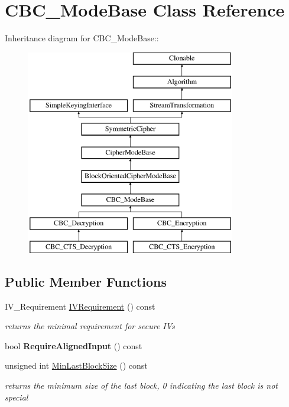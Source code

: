 \hypertarget{class_c_b_c___mode_base}{
\section{CBC\_\-ModeBase Class Reference}
\label{class_c_b_c___mode_base}
}
Inheritance diagram for CBC\_\-ModeBase::\begin{figure}[H]
\begin{center}
\leavevmode
\includegraphics[height=9cm]{class_c_b_c___mode_base}
\end{center}
\end{figure}
\subsection*{Public Member Functions}
\begin{DoxyCompactItemize}
\item 
\hypertarget{class_c_b_c___mode_base_a6ac61ad1f40cfdb1ba1d4b19ef3d60c4}{
IV\_\-Requirement \hyperlink{class_c_b_c___mode_base_a6ac61ad1f40cfdb1ba1d4b19ef3d60c4}{IVRequirement} () const }
\label{class_c_b_c___mode_base_a6ac61ad1f40cfdb1ba1d4b19ef3d60c4}

\begin{DoxyCompactList}\small\item\em returns the minimal requirement for secure IVs \item\end{DoxyCompactList}\item 
\hypertarget{class_c_b_c___mode_base_a489b4489eb6dd1ade027582f74ba2660}{
bool {\bfseries RequireAlignedInput} () const }
\label{class_c_b_c___mode_base_a489b4489eb6dd1ade027582f74ba2660}

\item 
\hypertarget{class_c_b_c___mode_base_a4a1900b5f7c1db0b71cd008c557fa618}{
unsigned int \hyperlink{class_c_b_c___mode_base_a4a1900b5f7c1db0b71cd008c557fa618}{MinLastBlockSize} () const }
\label{class_c_b_c___mode_base_a4a1900b5f7c1db0b71cd008c557fa618}

\begin{DoxyCompactList}\small\item\em returns the minimum size of the last block, 0 indicating the last block is not special \item\end{DoxyCompactList}\end{DoxyCompactItemize}
